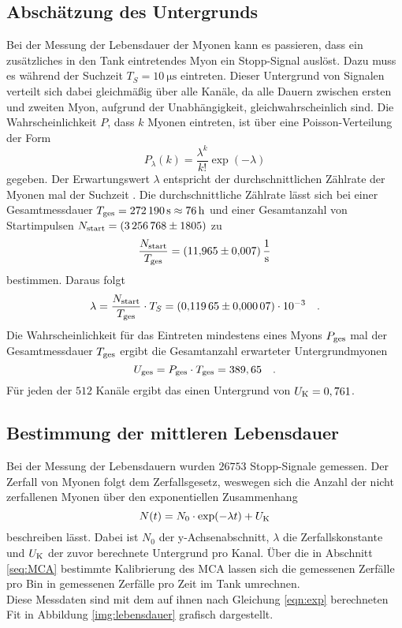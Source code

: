 \subsection{Abschätzung des Untergrunds}

\noindent
Bei der Messung der Lebensdauer der Myonen kann es passieren, dass ein zusätzliches in den Tank eintretendes Myon ein Stopp-Signal auslöst.
Dazu muss es während der Suchzeit $T_S = \SI{10}{\micro\second}$ eintreten. 
Dieser Untergrund von Signalen verteilt sich dabei gleichmäßig über alle Kanäle, da alle Dauern zwischen ersten und zweiten Myon, aufgrund der Unabhängigkeit, gleichwahrscheinlich sind. 
Die Wahrscheinlichkeit $P$, dass $k$ Myonen eintreten, ist über eine Poisson-Verteilung der Form 
\begin{equation*}
  P_{\lambda}(k)=  \frac{\lambda^k}{k!} \exp({-\lambda})
\end{equation*}
gegeben. Der Erwartungswert $\lambda$ entspricht der durchschnittlichen Zählrate der Myonen mal der Suchzeit .
Die durchschnittliche Zählrate lässt sich bei einer Gesamtmessdauer $T_\t{ges} = \SI{272190}{\second} \approx \SI{76}{\hour}$ 
und einer Gesamtanzahl von Startimpulsen $N_\t{start} = \SI{3256768(1805)}{}$ zu
\begin{equation*}
\frac{N_\t{start}}{T_\t{ges}} = \SI{11.965(0007)}{\per\second}
\end{equation*}
bestimmen. Daraus folgt 
\begin{equation*}
  \lambda = \frac{N_\t{start}}{T_\t{ges}} \cdot T_S = \SI{0.11965 (000007)e-3}{} \quad.
\end{equation*}
Die Wahrscheinlichkeit für das Eintreten mindestens eines Myons $P_\t{ges}$ mal der Gesamtmessdauer $T_\t{ges}$ ergibt die Gesamtanzahl erwarteter Untergrundmyonen
\begin{equation*}
  U_\t{ges} = P_\t{ges} \cdot T_\t{ges} = 389,65 \quad .
\end{equation*}
Für jeden der $512$ Kanäle ergibt das einen Untergrund von $U_\t{K} = 0,761$.


\subsection{Bestimmung der mittleren Lebensdauer}

\noindent
Bei der Messung der Lebensdauern wurden $26753$ Stopp-Signale gemessen. 
Der Zerfall von Myonen folgt dem Zerfallsgesetz, weswegen sich die Anzahl der nicht zerfallenen Myonen über den exponentiellen Zusammenhang
\begin{equation}
  N(t)=N_0\cdot \exp({-\lambda t})+U_\t{K} \label{eqn:exp}
\end{equation}
beschreiben lässt. Dabei ist $N_0$ der y-Achsenabschnitt, $\lambda $ die Zerfallskonstante und $U_\t{K} $ der zuvor berechnete Untergrund pro Kanal.
Über die in Abschnitt \ref{seq:MCA} bestimmte Kalibrierung des MCA lassen sich die gemessenen Zerfälle pro Bin in gemessenen Zerfälle pro Zeit im Tank umrechnen.\\
Diese Messdaten sind mit dem auf ihnen nach Gleichung \ref{eqn:exp} berechneten Fit in Abbildung \ref{img:lebensdauer} grafisch dargestellt.

